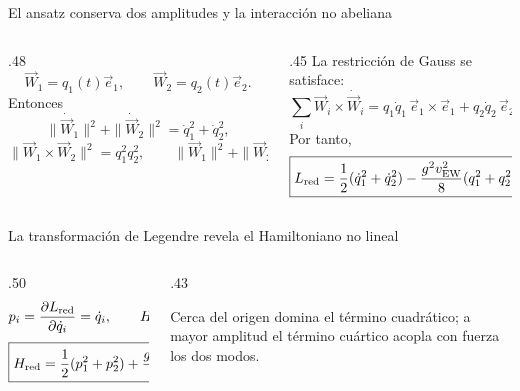 \documentclass[10pt,aspectratio=169]{beamer}
\begin{document}
\begin{frame}{El ansatz conserva dos amplitudes y la interacción no abeliana}
\begin{columns}[T,totalwidth=.97\textwidth]
\begin{column}{.48\textwidth}
\small
\[
\boxed{\vec W_1=q_1(t)\vec e_1,
\qquad
\vec W_2=q_2(t)\vec e_2.}
\]
Entonces
\[
\|\dot{\vec W}_1\|^2+\|\dot{\vec W}_2\|^2
=\dot q_1^2+\dot q_2^2,
\]
\[
\|\vec W_1\times\vec W_2\|^2=q_1^2q_2^2,
\qquad
\|\vec W_1\|^2+\|\vec W_2\|^2=q_1^2+q_2^2.
\]
\end{column}
\begin{column}{.45\textwidth}
\small
La restricción de Gauss se satisface:
\[
\sum_i\vec W_i\times\dot{\vec W}_i
=q_1\dot q_1\,\vec e_1\times\vec e_1
+q_2\dot q_2\,\vec e_2\times\vec e_2=0.
\]
Por tanto,
\[
\boxed{L_{\rm red}=\frac12(\dot q_1^2+\dot q_2^2)
-\frac{g^2v_{\rm EW}^2}{8}(q_1^2+q_2^2)
-\frac{g^2}{2}q_1^2q_2^2.}
\]
\end{column}
\end{columns}
\end{frame}

\begin{frame}{La transformación de Legendre revela el Hamiltoniano no lineal}
\begin{columns}[T,totalwidth=.97\textwidth]
\begin{column}{.50\textwidth}
\small
\[
p_i=\frac{\partial L_{\rm red}}{\partial\dot q_i}=\dot q_i,
\qquad
H=p_i\dot q_i-L_{\rm red}.
\]
\[
\boxed{H_{\rm red}=\frac12(p_1^2+p_2^2)
+\frac{g^2v_{\rm EW}^2}{8}(q_1^2+q_2^2)
+\frac{g^2}{2}q_1^2q_2^2.}
\]
\end{column}
\begin{column}{.43\textwidth}
\vspace{0.08cm}
{\scriptsize Cerca del origen domina el término cuadrático; a mayor amplitud el término cuártico acopla con fuerza los dos modos.}
\end{column}
\end{columns}
\end{frame}
\end{document}
